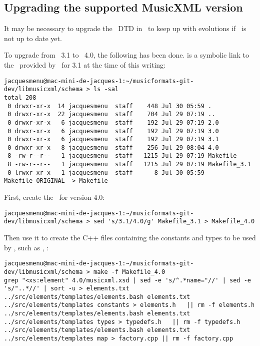 \subsection{Upgrading the supported MusicXML version}

It may be necessary to upgrade the \mxml\ DTD in \elementsFolder\ to keep up with evolutions if \libmusicxml\ is not up to date yet.

To upgrade from \mxml\ 3.1 to \mxml\ 4.0, the following has been done.  is a symbolic link to the \Makefile\ provided by \libmusicxml\ for 3.1 at the time of this writing:
\begin{lstlisting}[language=Terminal]
jacquesmenu@mac-mini-de-jacques-1:~/musicformats-git-dev/libmusicxml/schema > ls -sal
total 208
 0 drwxr-xr-x  14 jacquesmenu  staff    448 Jul 30 05:59 .
 0 drwxr-xr-x  22 jacquesmenu  staff    704 Jul 29 07:19 ..
 0 drwxr-xr-x   6 jacquesmenu  staff    192 Jul 29 07:19 2.0
 0 drwxr-xr-x   6 jacquesmenu  staff    192 Jul 29 07:19 3.0
 0 drwxr-xr-x   6 jacquesmenu  staff    192 Jul 29 07:19 3.1
 0 drwxr-xr-x   8 jacquesmenu  staff    256 Jul 29 08:04 4.0
 8 -rw-r--r--   1 jacquesmenu  staff   1215 Jul 29 07:19 Makefile
 8 -rw-r--r--   1 jacquesmenu  staff   1215 Jul 29 07:19 Makefile_3.1
 0 lrwxr-xr-x   1 jacquesmenu  staff      8 Jul 30 05:59 Makefile_ORIGINAL -> Makefile
\end{lstlisting}

First, create the \Makefile\ for version 4.0:
\begin{lstlisting}[language=Terminal]
jacquesmenu@mac-mini-de-jacques-1:~/musicformats-git-dev/libmusicxml/schema > sed 's/3.1/4.0/g' Makefile_3.1 > Makefile_4.0
\end{lstlisting}

Then use it to create the C++ files containing the constants and types to be used by \mxsrRepr, such as , :
\begin{lstlisting}[language=Terminal]
jacquesmenu@mac-mini-de-jacques-1:~/musicformats-git-dev/libmusicxml/schema > make -f Makefile_4.0
grep "<xs:element" 4.0/musicxml.xsd | sed -e 's/^.*name="//' | sed -e 's/"..*//' | sort -u > elements.txt
../src/elements/templates/elements.bash elements.txt ../src/elements/templates constants > elements.h   || rm -f elements.h
../src/elements/templates/elements.bash elements.txt ../src/elements/templates types > typedefs.h   || rm -f typedefs.h
../src/elements/templates/elements.bash elements.txt ../src/elements/templates map > factory.cpp || rm -f factory.cpp
\end{lstlisting}

